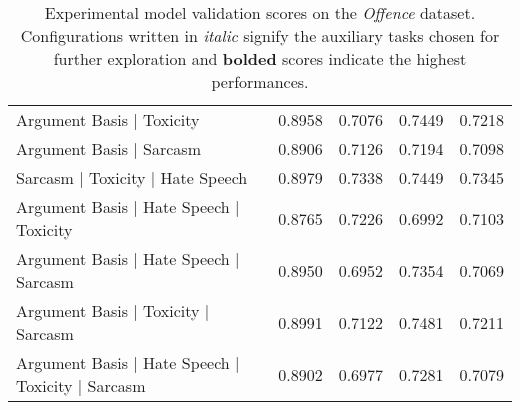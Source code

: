 \begin{table}[]
{\begin{tabular}{l|cccc}
    Argument Basis | Toxicity                         & 0.8958          & 0.7076    & 0.7449          & 0.7218          \\
    Argument Basis | Sarcasm                          & 0.8906          & 0.7126    & 0.7194          & 0.7098          \\
    Sarcasm | Toxicity | Hate Speech                  & 0.8979          & 0.7338    & 0.7449          & 0.7345          \\
    Argument Basis | Hate Speech | Toxicity           & 0.8765          & 0.7226    & 0.6992          & 0.7103          \\
    Argument Basis | Hate Speech | Sarcasm            & 0.8950          & 0.6952    & 0.7354          & 0.7069          \\
    Argument Basis | Toxicity | Sarcasm               & 0.8991          & 0.7122    & 0.7481          & 0.7211          \\
    Argument Basis | Hate Speech | Toxicity | Sarcasm & 0.8902          & 0.6977    & 0.7281          & 0.7079
  \end{tabular}%
  }
  \caption{Experimental model validation scores on the \textit{Offence} dataset. Configurations written in \textit{italic} signify the auxiliary tasks chosen for further exploration and \textbf{bolded} scores indicate the highest performances.}
  \label{tab:mtl_dev_davidson}
\end{table}

